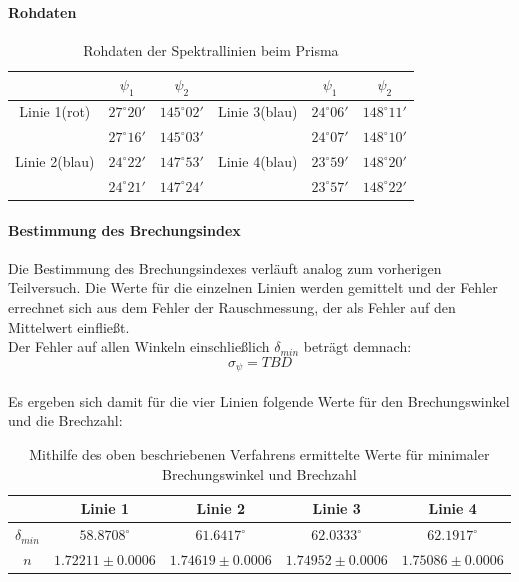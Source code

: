 \documentclass[12pt,a4paper]{article}
\begin{document}
	\paragraph{Rohdaten}
	\begin{table}
		\begin{tabular}{|c|c|c||c|c|c|}
			\hline 
			& $\psi_1$ & $\psi_2$ & & $\psi_1$ & $\psi_2$ \\ 
			\hline 
			Linie 1(rot) & $27^\circ 20'$ & $145^\circ 02'$ & Linie 3(blau) & $24^\circ 06'$ & $148^\circ 11'$\\ 
			\hline 
			& $27^\circ 16'$ & $145^\circ 03'$& & $24^\circ 07'$ & $148^\circ 10'$\\
			\hline
			\hline 
			\hline 
			Linie 2(blau) & $24^\circ 22'$ & $147^\circ 53'$ & Linie 4(blau) & $23^\circ 59'$ & $148^\circ 20'$\\ 
			\hline 
			& $24^\circ 21'$ & $147^\circ 24'$&  & $23^\circ 57'$ & $148^\circ 22'$\\ 
			\hline 
		\end{tabular} 
		\caption{Rohdaten der Spektrallinien beim Prisma}
	\end{table}
	
	\paragraph{Bestimmung des Brechungsindex}
	Die Bestimmung des Brechungsindexes verläuft analog zum vorherigen Teilversuch. Die Werte für die einzelnen Linien werden gemittelt und der Fehler errechnet sich aus dem Fehler der Rauschmessung, der als Fehler auf den Mittelwert einfließt.\\
	Der Fehler auf allen Winkeln einschließlich $\delta_{min}$ beträgt demnach:
	\begin{equation}
	\sigma_{\psi} = TBD
	\end{equation}
	\\
	Es ergeben sich damit für die vier Linien folgende Werte für den Brechungswinkel und die Brechzahl:
	\begin{table}
		\begin{tabular}{|c|c|c|c|c|}
			\hline
			& Linie 1 & Linie 2 & Linie 3 & Linie 4\\
			\hline
			$\delta_{min}$ & $58.8708^\circ$ & $61.6417^\circ$ & $62.0333^\circ$ & $62.1917^\circ$\\
			\hline
			$n$ & $1.72211\pm 0.0006$ & $1.74619\pm 0.0006$ & $1.74952\pm 0.0006$ & $1.75086\pm 0.0006$\\
			\hline
		\end{tabular}
		\caption{Mithilfe des oben beschriebenen Verfahrens ermittelte Werte für minimaler Brechungswinkel und Brechzahl}
	\end{table}
\end{document}

